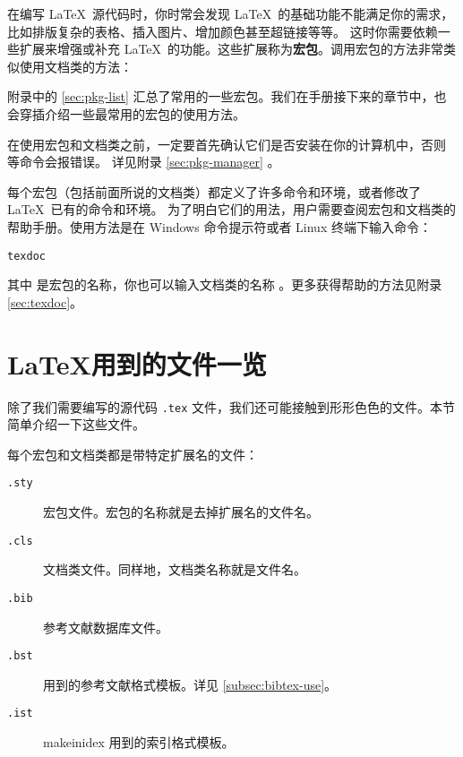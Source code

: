 在编写 \LaTeX\ 源代码时，你时常会发现 \LaTeX\ 的基础功能不能满足你的需求，比如排版复杂的表格、插入图片、增加颜色甚至超链接等等。
这时你需要依赖一些扩展来增强或补充 \LaTeX\ 的功能。这些扩展称为\textbf{宏包}。调用宏包的方法非常类似使用文档类的方法：
\begin{command}
\end{command}

附录中的 \ref{sec:pkg-list} 汇总了常用的一些宏包。我们在手册接下来的章节中，也会穿插介绍一些最常用的宏包的使用方法。

在使用宏包和文档类之前，一定要首先确认它们是否安装在你的计算机中，否则  等命令会报错误。
详见附录 \ref{sec:pkg-manager} 。

每个宏包（包括前面所说的文档类）都定义了许多命令和环境，或者修改了 \LaTeX\ 已有的命令和环境。
为了明白它们的用法，用户需要查阅宏包和文档类的帮助手册。使用方法是在 Windows 命令提示符或者 Linux 终端下输入命令：
\begin{command}
\texttt{texdoc} 
\end{command}

其中  是宏包的名称，你也可以输入文档类的名称 。更多获得帮助的方法见附录 \ref{sec:texdoc}。

\section{\LaTeX 用到的文件一览}\label{sec:latex-files}

除了我们需要编写的源代码 \texttt{.tex} 文件，我们还可能接触到形形色色的文件。本节简单介绍一下这些文件。

每个宏包和文档类都是带特定扩展名的文件：
\begin{description}
  \item[\texttt{.sty}] 宏包文件。宏包的名称就是去掉扩展名的文件名。
  \item[\texttt{.cls}] 文档类文件。同样地，文档类名称就是文件名。
  \item[\texttt{.bib}]  参考文献数据库文件。
  \item[\texttt{.bst}]  用到的参考文献格式模板。详见 \ref{subsec:bibtex-use}。
  \item[\texttt{.ist}] makeinidex 用到的索引格式模板。
\end{description}

